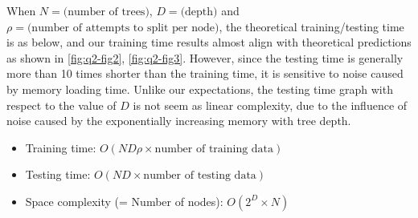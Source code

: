 \noindent
When $N = \text{(number of trees)}$, $D = \text{(depth)}$ and $\rho = \text{(number of attempts to split per node)}$, the theoretical training/testing time is as below, and our training time results almost align with theoretical predictions as shown in \cref{fig:q2-fig2}, \cref{fig:q2-fig3}. However, since the testing time is generally more than 10 times shorter than the training time, it is sensitive to noise caused by memory loading time. Unlike our expectations, the testing time graph with respect to the value of $D$ is not seem as linear complexity, due to the influence of noise caused by the exponentially increasing memory with tree depth.

\begin{itemize}
	\item Training time: $O(ND\rho \times \text{number of training data})$
	\item Testing time: $O(ND \times \text{number of testing data})$
	\item Space complexity (= Number of nodes): $O(2^{D} \times N)$
\end{itemize}

